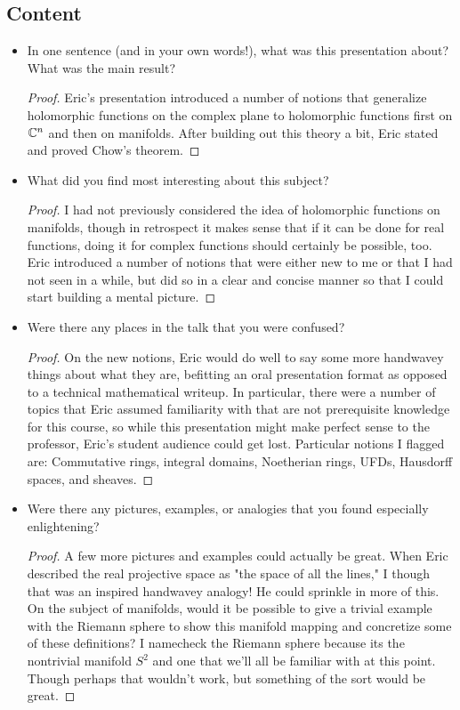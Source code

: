 \documentclass[../finalProject.tex]{subfiles}
\begin{document}
\subsection*{Content}
\begin{itemize}
    \item In one sentence (and in your own words!), what was this presentation about? What was the main result?
    \begin{proof}
        Eric's presentation introduced a number of notions that generalize holomorphic functions on the complex plane to holomorphic functions first on $\mathbb{C}^n$ and then on manifolds. After building out this theory a bit, Eric stated and proved Chow's theorem.
    \end{proof}
    \item What did you find most interesting about this subject?
    \begin{proof}
        I had not previously considered the idea of holomorphic functions on manifolds, though in retrospect it makes sense that if it can be done for real functions, doing it for complex functions should certainly be possible, too. Eric introduced a number of notions that were either new to me or that I had not seen in a while, but did so in a clear and concise manner so that I could start building a mental picture.
    \end{proof}
    \item Were there any places in the talk that you were confused?
    \begin{proof}
        On the new notions, Eric would do well to say some more handwavey things about what they are, befitting an oral presentation format as opposed to a technical mathematical writeup. In particular, there were a number of topics that Eric assumed familiarity with that are not prerequisite knowledge for this course, so while this presentation might make perfect sense to the professor, Eric's student audience could get lost. Particular notions I flagged are: Commutative rings, integral domains, Noetherian rings, UFDs, Hausdorff spaces, and sheaves.
    \end{proof}
    \item Were there any pictures, examples, or analogies that you found especially enlightening?
    \begin{proof}
        A few more pictures and examples could actually be great. When Eric described the real projective space as "the space of all the lines," I though that was an inspired handwavey analogy! He could sprinkle in more of this. On the subject of manifolds, would it be possible to give a trivial example with the Riemann sphere to show this manifold mapping and concretize some of these definitions? I namecheck the Riemann sphere because its the nontrivial manifold $S^2$ and one that we'll all be familiar with at this point. Though perhaps that wouldn't work, but something of the sort would be great.
    \end{proof}
\end{itemize}
\end{document}
